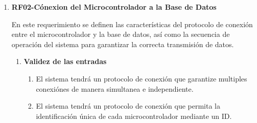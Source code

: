 \begin{enumerate}
\begin{enumerate}
\begin{enumerate}
                \end{enumerate}   
         
\newpage
            \item \textbf{Respuestas a situaciones anormales}
                \begin{enumerate}
                    \item El sistema generará una alerta y la registrará en la base de datos.Si la comunicación con cualquier sensor (pH, temperatura, CO) se interrumpe ya sea en modo prueba o monitoreo.
                    \item Si el pH supero el parametro de 4.2, se generará una alerta y el sistema dejará de sensar.
                \end{enumerate}   
       
            \item \textbf{Efecto de los parámetros}
                \begin{enumerate} 
                    \item El formato de datos deberá soportar diferentes tipos de datos (números decimales para pH y temperatura, enteros para CO2, cadenas para ID y timestamp) en una estructura anidada, permitiendo flexibilidad para futuros sensores.
                \end{enumerate}   
        
            \item \textbf{Relación entre las salidas y las entradas}
                \begin{enumerate}
                    \item Los sensores proporcionan valores crudos y el formato de datos integrará dichos valores de forma anidada.
                \end{enumerate}
        \end{enumerate}




    \item \label{it:RF02} \textbf{RF02-Cónexion del Microcontrolador a la Base de Datos}
    
        En este requerimiento se definen las características del protocolo de conexión
        entre el microcontrolador y la base de datos, así como la secuencia de operación
        del sistema para garantizar la correcta transmisión de datos.
        \begin{enumerate}
            \item \textbf{Validez de las entradas}
                \begin{enumerate}
                    \item El sistema tendrá un protocolo de conexión que garantize multiples conexiónes de manera simultanea e independiente.
                    \item El sistema tendrá un protocolo de conexión que permita la identificación única de cada microcontrolador mediante un ID.
                \end{enumerate}   
            

\end{enumerate}
\end{enumerate}
